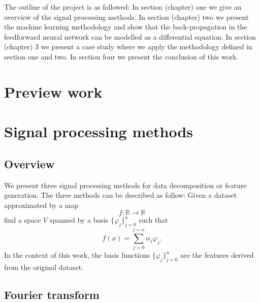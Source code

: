 \documentclass[11pt, oneside]{article}   	%
\begin{document}
\begin{flushleft}
The outline of the project is as followed: In section (chapter) one we give an overview of the signal processing methods. In section (chapter) two we present the machine learning methodology and show that the back-propagation in the feedforward neural network can be modelled as a differential equation.
In section (chapter) 3 we present a case study where we apply the methodology defined in section one and two. In section four we present the conclusion of this work.
\end{flushleft}


\section{Preview work}

\section{Signal processing methods}
\subsection{Overview}
We present three signal processing methods for data decomposition or feature generation. The three methods can be described as follow: Given a dataset  approximated by a map
\begin{equation}
f: \mathbb{R} \rightarrow \mathbb{R}
\end{equation}
find a space $V$ spanned by a basis $\{ \varphi_{j} \}_{j=0}^{n}$ such that 
\begin{equation}
f(x) = \sum_{j=0}^{j=n}\alpha_{j}\varphi_{j}.
\end{equation}
In the context of this work, the basis functions $\{ \varphi_{j} \}_{j=0}^{n}$ are the features derived from the original dataset.
\subsection{Fourier transform}
\end{document}
